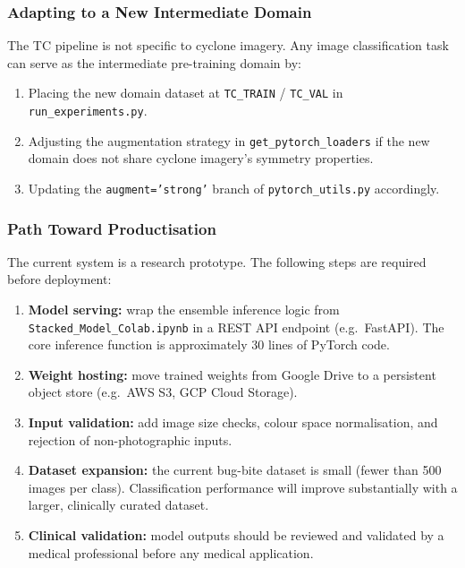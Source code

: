 \documentclass[12pt,a4paper]{article}
\begin{document}
\subsubsection{Adapting to a New Intermediate Domain}

The TC pipeline is not specific to cyclone imagery. Any image classification
task can serve as the intermediate pre-training domain by:
\begin{enumerate}
    \item Placing the new domain dataset at \texttt{TC\_TRAIN} / \texttt{TC\_VAL}
          in \texttt{run\_experiments.py}.
    \item Adjusting the augmentation strategy in \texttt{get\_pytorch\_loaders}
          if the new domain does not share cyclone imagery's symmetry properties.
    \item Updating the \texttt{augment='strong'} branch of
          \texttt{pytorch\_utils.py} accordingly.
\end{enumerate}

\subsubsection{Path Toward Productisation}

The current system is a research prototype. The following steps are required
before deployment:

\begin{enumerate}
    \item \textbf{Model serving:} wrap the ensemble inference logic from
          \texttt{Stacked\_Model\_Colab.ipynb} in a REST API endpoint
          (e.g.\ FastAPI). The core inference function is approximately
          30 lines of PyTorch code.
    \item \textbf{Weight hosting:} move trained weights from Google Drive to
          a persistent object store (e.g.\ AWS S3, GCP Cloud Storage).
    \item \textbf{Input validation:} add image size checks, colour space
          normalisation, and rejection of non-photographic inputs.
    \item \textbf{Dataset expansion:} the current bug-bite dataset is small
          (fewer than 500 images per class). Classification performance will
          improve substantially with a larger, clinically curated dataset.
    \item \textbf{Clinical validation:} model outputs should be reviewed and
          validated by a medical professional before any medical application.
\end{enumerate}

\end{document}
